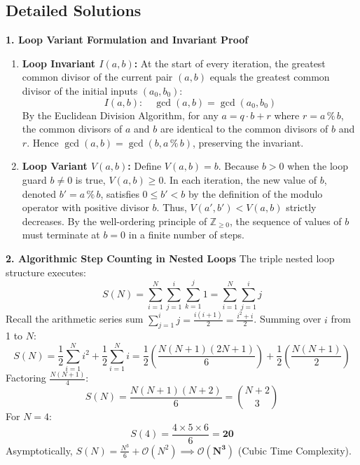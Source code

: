 \subsection*{Detailed Solutions}

\textbf{1. Loop Variant Formulation and Invariant Proof}
\begin{enumerate}
    \item \textbf{Loop Invariant $I(a, b)$:}
    At the start of every iteration, the greatest common divisor of the current pair $(a, b)$ equals the greatest common divisor of the initial inputs $(a_0, b_0)$:
    \begin{equation*}
    I(a, b): \quad \gcd(a, b) = \gcd(a_0, b_0)
    \end{equation*}
    By the Euclidean Division Algorithm, for any $a = q \cdot b + r$ where $r = a \mathbin{\%} b$, the common divisors of $a$ and $b$ are identical to the common divisors of $b$ and $r$. Hence $\gcd(a, b) = \gcd(b, a \mathbin{\%} b)$, preserving the invariant.
    \item \textbf{Loop Variant $V(a, b)$:}
    Define $V(a, b) = b$.
    Because $b > 0$ when the loop guard $b \neq 0$ is true, $V(a, b) \ge 0$.
    In each iteration, the new value of $b$, denoted $b' = a \mathbin{\%} b$, satisfies $0 \le b' < b$ by the definition of the modulo operator with positive divisor $b$.
    Thus, $V(a', b') < V(a, b)$ strictly decreases. By the well-ordering principle of $\mathbb{Z}_{\ge 0}$, the sequence of values of $b$ must terminate at $b = 0$ in a finite number of steps.
\end{enumerate}

\textbf{2. Algorithmic Step Counting in Nested Loops}
The triple nested loop structure executes:
\begin{equation*}
S(N) = \sum_{i=1}^N \sum_{j=1}^i \sum_{k=1}^j 1 = \sum_{i=1}^N \sum_{j=1}^i j
\end{equation*}
Recall the arithmetic series sum $\sum_{j=1}^i j = \frac{i(i+1)}{2} = \frac{i^2 + i}{2}$.
Summing over $i$ from 1 to $N$:
\begin{equation*}
S(N) = \frac{1}{2} \sum_{i=1}^N i^2 + \frac{1}{2} \sum_{i=1}^N i = \frac{1}{2} \left( \frac{N(N+1)(2N+1)}{6} \right) + \frac{1}{2} \left( \frac{N(N+1)}{2} \right)
\end{equation*}
Factoring $\frac{N(N+1)}{4}$:
\begin{equation*}
S(N) = \frac{N(N+1)(N+2)}{6} = \binom{N+2}{3}
\end{equation*}
For $N = 4$:
\begin{equation*}
S(4) = \frac{4 \times 5 \times 6}{6} = \mathbf{20}
\end{equation*}
Asymptotically, $S(N) = \frac{N^3}{6} + \mathcal{O}(N^2) \implies \mathbf{\mathcal{O}(N^3)}$ (Cubic Time Complexity).

